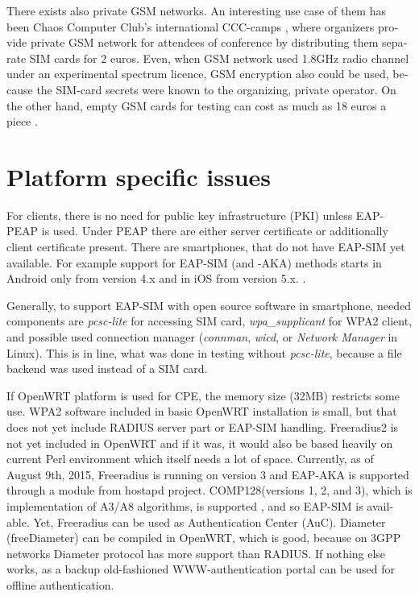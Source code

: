\documentclass[12pt,a4paper,english]{tutthesis}
\begin{document}
\begin{otherlanguage}{english}
There exists also private GSM networks. An interesting use case
of them  has been Chaos Computer Club's international 
CCC-camps \cite{ccc}, where organizers 
provide private GSM network for attendees of conference
by distributing them separate SIM cards for 2 euros.  Even, when GSM
network used 1.8GHz radio channel under an experimental spectrum
licence,  GSM encryption also could be used, because the SIM-card secrets were known
to the organizing, private operator.
On the other hand, empty GSM cards for testing can cost as much as 
18 euros a piece \cite{smartjac-testsim}.


\section{Platform specific issues}
\label{sec-6-3}

\label{sec:pcsc}

For clients, there is no need for public key infrastructure (PKI)
unless EAP-PEAP is used. Under PEAP there are either server
certificate or additionally client certificate present.  There are
smartphones, that do not have EAP-SIM yet available.  For example
support for EAP-SIM (and -AKA) methods starts in Android only from
version 4.x and in iOS from version 5.x. \cite{sim-support}.

Generally, to support EAP-SIM  with open source software in 
smartphone, needed components are \emph{pcsc-lite} for accessing SIM card, \emph{wpa\_supplicant} for
WPA2 client, and possible used connection manager (\emph{connman},
\emph{wicd}, or \emph{Network Manager} in Linux). This is in line, what was done in testing without \emph{pcsc-lite},
because a file backend was used instead of a SIM card.




If OpenWRT platform is used for CPE, the memory size (32MB) restricts
some use.
WPA2 software included in basic OpenWRT installation is small,
but that does not yet include RADIUS server part or EAP-SIM handling.
Freeradius2 is not yet included in OpenWRT and if it was, it would
also be based heavily on current Perl environment which itself needs a
lot of space.  Currently, as of August 9th, 2015, Freeradius is
running on version 3 and EAP-AKA is supported through a module from
hostapd project.  COMP128(versions 1, 2, and 3), which is
implementation of A3/A8 algorithms, is supported \cite{freeradius2},
and so EAP-SIM is available.  Yet, Freeradius can be used as
Authentication Center (AuC).  Diameter (freeDiameter) can be compiled
in OpenWRT, which is good, because on 3GPP networks Diameter protocol
has more support than RADIUS.  If nothing else works, as a backup
old-fashioned WWW-authentication portal can be used for offline
authentication.











\end{otherlanguage}
\end{document}
